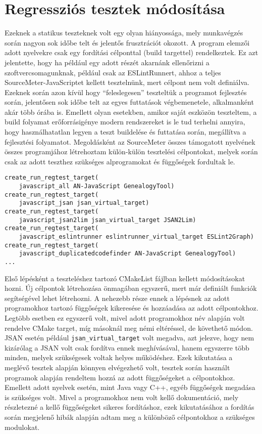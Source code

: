\section{Regressziós tesztek módosítása}

Ezeknek a statikus teszteknek volt egy olyan hiányossága, mely munkavégzés során nagyon sok időbe telt és jelentős frusztrációt okozott. A program elemzői adott nyelvekre csak egy fordítási célponttal (build targettel) rendelkeztek. Ez azt jelentette, hogy ha például egy adott részét akarnánk ellenőrizni a szoftvercsomagunknak, például csak az ESLintRunnert, ahhoz a teljes SourceMeter-JavaScriptet kellett tesztelnünk, mert célpont nem volt definiálva. Ezeknek során azon kívül hogy ``feleslegesen'' teszteltük a programot fejlesztés során, jelentősen sok időbe telt az egyes futtatások végbemenetele, alkalmanként akár több órába is. Emellett olyan esetekben, amikor saját eszközön teszteltem, a build folyamat erőforrásigénye modern rendszereket is le tud terhelni annyira, hogy használhatatlan legyen a teszt buildelése és futtatása során, megállítva a fejlesztési folyamatot.
Megoldásként az SourceMeter összes támogatott nyelvének összes programjához létrehoztam külön-külön tesztelési célpontokat, melyek során csak az adott teszthez szükséges alprogramokat és függőségek fordultak le.

\begin{lstlisting}[caption={CMake célpontok JavaScript teszteléshez},label={lst:abs-computedfiltering}, style={CStyle}]
create_run_regtest_target(
    javascript_all AN-JavaScript GenealogyTool)
create_run_regtest_target(
    javascript_jsan jsan_virtual_target)
create_run_regtest_target(
    javascript_jsan2lim jsan_virtual_target JSAN2Lim)
create_run_regtest_target(
    javascript_eslintrunner eslintrunner_virtual_target ESLint2Graph)
create_run_regtest_target(
    javascript_duplicatedcodefinder AN-JavaScript GenealogyTool)
...
\end{lstlisting}
    
Első lépésként a teszteléshez tartozó CMakeList fájlban kellett módosításokat hozni. Új célpontok létrehozása önmagában egyszerű, mert már definiált funkciók segítségével lehet létrehozni. A nehezebb része ennek a lépésnek az adott programokhoz tartozó függőségek kikeresése és hozzáadása az adott célpontokhoz. Legtöbb esetben ez egyszerű volt, mivel adott programokhoz név alapján volt rendelve CMake target, míg másoknál meg némi eltéréssel, de követhető módon. JSAN esetén például \texttt{jsan\_virtual\_target} volt megadva, azt jelezve, hogy nem kizárólag a JSAN volt csak fordítva ennek meghívásával, hanem egyszerre több minden, melyek szükségesek voltak helyes működéshez. Ezek kikutatása a meglévő tesztek alapján könnyen elvégezhető volt, tesztek során használt programok alapján rendeltem hozzá az adott függőségeket a célpontokhoz. Emellett adott nyelvek esetén, mint Java vagy C++, egyéb függőségek megadása is szükséges volt. Mivel a programokhoz nem volt kellő dokumentáció, mely részletezné a kellő függőségeket sikeres fordításhoz, ezek kikutatásához a fordítás során megjelenő hibák alapján adtam meg a különböző célpontokhoz a szükséges modulokat. 

